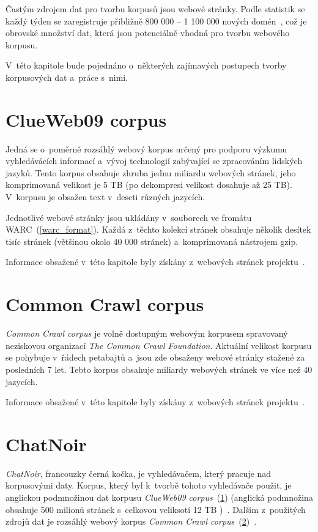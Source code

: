 Častým zdrojem dat pro tvorbu korpusů jsou webové stránky. Podle statistik se
každý týden se zaregistruje přibližně 800 000 -- 1 100 000 nových domén~\cite{NEWPAGES},
což je obrovské množství dat, která jsou potenciálně vhodná pro tvorbu webového korpusu.

V~této kapitole bude pojednáno o~některých zajímavých postupech tvorby korpusových dat
a~práce s~nimi.

\section{ClueWeb09 corpus}
\label{ClueWeb09}
Jedná se o~poměrně rozsáhlý webový korpus určený pro podporu výzkumu vyhledávácích informací
a~vývoj technologií zabývající se zpracováním lidských jazyků. Tento korpus obsahuje zhruba
jednu miliardu webových stránek, jeho komprimovaná velikost je 5 TB (po dekompresi velikost
dosahuje až 25 TB). V~korpusu je obsažen text v~deseti různých jazycích.

Jednotlivé webové stránky jsou ukládány v~souborech ve fromátu WARC~(\ref{warc_format}).
Každá z~těchto kolekcí stránek obsahuje několik desítek tisíc stránek (většinou okolo 40 000 stránek) a~komprimovaná
nástrojem gzip.

Informace obsažené v~této kapitole byly získány z~webových stránek projektu~\cite{CLUEWEB}.

\section{Common Crawl corpus}
\label{commoncrawl}
\textit{Common Crawl corpus} je volně dostupným webovým korpusem spravovaný neziskovou organizací
\textit{The Common Crawl Foundation}. Aktuální velikost korpusu se pohybuje v~řádech petabajtů a~jsou zde obsaženy webové stránky stažené za posledních 7 let. Tebto korpus obsahuje miliardy
webových stránek ve více než 40 jazycích.

Informace obsažené v~této kapitole byly získány z~webových stránek projektu~\cite{COMMONCRAWL}.

\section{ChatNoir}
\textit{ChatNoir}, francouzky černá kočka, je vyhledávačem, který pracuje nad korpusovými daty. Korpus,
který byl k~tvorbě tohoto vyhledávače použit, je anglickou podmnožinou dat korpusu \textit{ClueWeb09 corpus}~(\ref{ClueWeb09}) (anglická podmnožina obsahuje 500 milionů stránek s~celkovou veliksotí 12 TB )~\cite{CHATNOIR}.
Dalším z~použitých zdrojů dat je rozsáhlý webový korpus \textit{Common Crawl corpus}~(\ref{commoncrawl})~\cite{COMMONCRAWL_EXAMPLES}.

